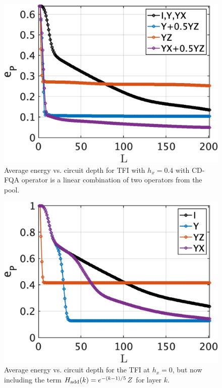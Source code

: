 \documentclass[twocolumn,aps,superscriptaddress,floatfix,longbibliography]{revtex4-2}
\newcommand{\awc}[1]{{\color[rgb]{.8,.6,.6}{[AW: {\it #1}\,]}}}
\begin{document}
\begin{figure}
    \centering
    \includegraphics[scale=0.185]{Lcomb.jpg}
    \caption{Average energy
   vs. circuit depth for TFI with  $h_x=0.4$ with CD-FQA operator is a linear combination of two operators from the pool.
   }
    \label{fig:Lcomb}
\end{figure}



\begin{figure}[tbh!]
\centering
\includegraphics[scale=0.185]{GHZ100_pert.jpg}
\caption{ %
   Average energy %
   vs. circuit depth for the TFI at $h_x=0$,
   but now including the  term
   $H_{\rm add}(k) %
   =e^{-(k-1)/5} \, Z$ for layer $k$. %
}\label{fig:GHZpert}
\end{figure}
\end{document}
